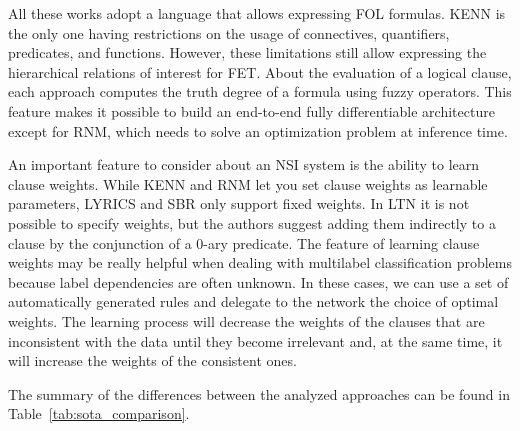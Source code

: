 All these works adopt a language that allows expressing FOL formulas. KENN is the only one having restrictions on the usage of connectives, quantifiers, predicates, and functions. However, these limitations still allow expressing the hierarchical relations of interest for FET. About the evaluation of a logical clause, each approach computes the truth degree of a formula using fuzzy operators. This feature makes it possible to build an end-to-end fully differentiable architecture except for RNM, which needs to solve an optimization problem at inference time.

An important feature to consider about an NSI system is the ability to learn clause weights. While KENN and RNM let you set clause weights as learnable parameters, LYRICS and SBR only support fixed weights. In LTN it is not possible to specify weights, but the authors suggest adding them indirectly to a clause by the conjunction of a 0-ary predicate. The feature of learning clause weights may be really helpful when dealing with multilabel classification problems because label dependencies are often unknown. In these cases, we can use a set of automatically generated rules and delegate to the network the choice of optimal weights. The learning process will decrease the weights of the clauses that are inconsistent with the data until they become irrelevant and, at the same time, it will increase the weights of the consistent ones.

The summary of the differences between the analyzed approaches can be found in Table~\ref{tab:sota_comparison}.

